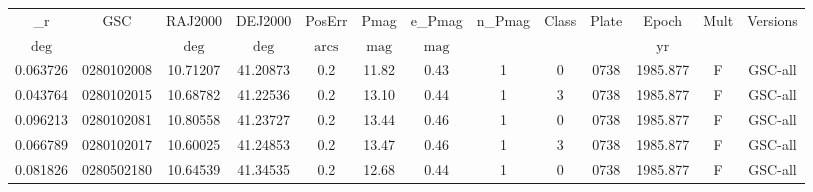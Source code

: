 \begin{table}
\begin{tabular}{ccccccccccccc}
_r & GSC & RAJ2000 & DEJ2000 & PosErr & Pmag & e_Pmag & n_Pmag & Class & Plate & Epoch & Mult & Versions \\
$\mathrm{deg}$ &  & $\mathrm{deg}$ & $\mathrm{deg}$ & $\mathrm{arcs}$ & $\mathrm{mag}$ & $\mathrm{mag}$ &  &  &  & $\mathrm{yr}$ &  &  \\
0.063726 & 0280102008 & 10.71207 & 41.20873 & 0.2 & 11.82 & 0.43 & 1 & 0 & 0738 & 1985.877 & F & GSC-all \\
0.043764 & 0280102015 & 10.68782 & 41.22536 & 0.2 & 13.10 & 0.44 & 1 & 3 & 0738 & 1985.877 & F & GSC-all \\
0.096213 & 0280102081 & 10.80558 & 41.23727 & 0.2 & 13.44 & 0.46 & 1 & 0 & 0738 & 1985.877 & F & GSC-all \\
0.066789 & 0280102017 & 10.60025 & 41.24853 & 0.2 & 13.47 & 0.46 & 1 & 3 & 0738 & 1985.877 & F & GSC-all \\
0.081826 & 0280502180 & 10.64539 & 41.34535 & 0.2 & 12.68 & 0.44 & 1 & 0 & 0738 & 1985.877 & F & GSC-all \\
\end{tabular}
\end{table}
